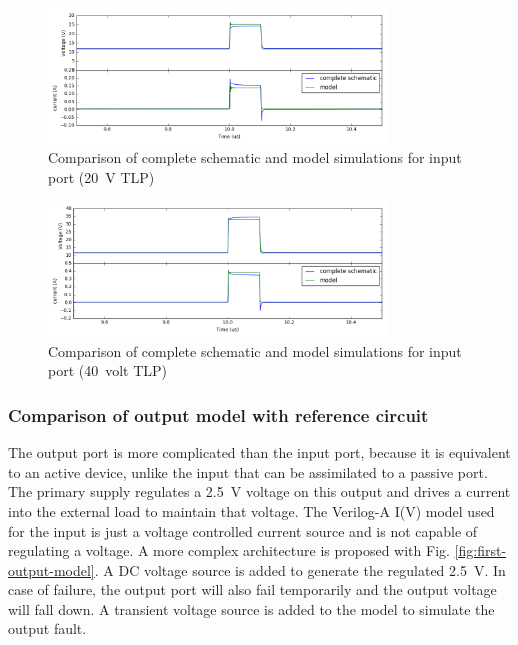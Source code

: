 \begin{figure}[!p]
  \centering
  \includegraphics[width=0.8\textwidth]{src/4/figures/comparison_model_total_20V.png}
  \caption{Comparison of complete schematic and model simulations for input port (\SI{20}{\volt} TLP)}
  \label{fig:compare-model-simu-20}
\end{figure}

\begin{figure}[!p]
  \centering
  \includegraphics[width=0.8\textwidth]{src/4/figures/comparison_model_total_40V.png}
  \caption{Comparison of complete schematic and model simulations for input port (\SI{40}{volt} TLP)}
  \label{fig:compare-model-simu-40}
\end{figure}

\subsubsection{Comparison of output model with reference circuit}

The output port is more complicated than the input port, because it is equivalent to an active device, unlike the input that can be assimilated to a passive port.
The primary supply regulates a \SI{2.5}{\volt} voltage on this output and drives a current into the external load to maintain that voltage.
The Verilog-A I(V) model used for the input is just a voltage controlled current source and is not capable of regulating a voltage.
A more complex architecture is proposed with Fig. \ref{fig:first-output-model}.
A DC voltage source is added to generate the regulated \SI{2.5}{\volt}.
In case of failure, the output port will also fail temporarily and the output voltage will fall down.
A transient voltage source is added to the model to simulate the output fault.

